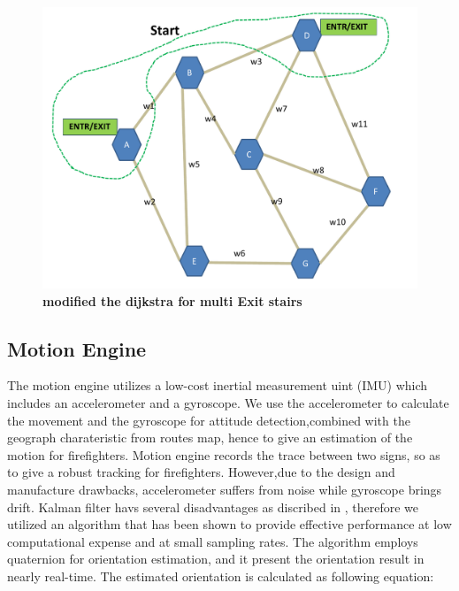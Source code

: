 \documentclass[conference]{IEEEtran}
\begin{document}
  \begin{figure}[ht]
  \label{fig:dijkstra}
  \centering
  \includegraphics[width=0.8 \linewidth]{pic/dijkstra.pdf}
  \caption{\bf modified the dijkstra for multi Exit stairs}
  \end{figure}

    \subsection{Motion Engine}
    
    The motion engine utilizes a low-cost inertial measurement uint (IMU) which includes an accelerometer and a gyroscope. We use the accelerometer to calculate the movement and the gyroscope for attitude detection,combined with the geograph charateristic from routes map, hence to give an estimation of the motion for firefighters. Motion engine records the trace between two signs, so as to give a robust tracking for firefighters. However,due to the design and manufacture drawbacks, accelerometer suffers from noise while gyroscope brings drift. Kalman filter havs several disadvantages as discribed in \cite{marins2001extended} \cite{luinge2005measuring}, therefore we utilized an algorithm that has been shown to provide effective performance at low computational expense and at small sampling rates. The algorithm employs quaternion for orientation estimation\cite{madgwick2011estimation}, and it present the orientation result in nearly real-time. The estimated orientation is calculated as following equation:
\end{document}
